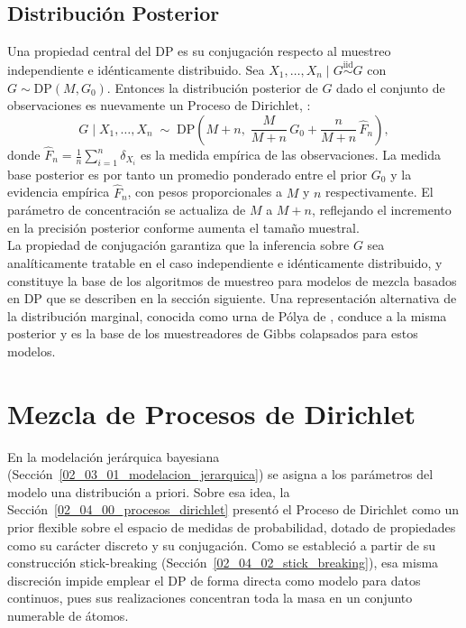 \subsection{Distribución Posterior}
\label{02_04_03_posterior_dp}
Una propiedad central del DP es su conjugación respecto al muestreo independiente e idénticamente distribuido. Sea $X_1, \dots, X_n \mid G \overset{\mathrm{iid}}{\sim} G$ con $G \sim \mathrm{DP}(M, G_0)$. Entonces la distribución posterior de $G$ dado el conjunto de observaciones es nuevamente un Proceso de Dirichlet, \cite{02_04_muller2015bayesian}:
\begin{equation}\label{eq:dp_posterior}
    G \mid X_1, \dots, X_n \;\sim\;
    \mathrm{DP}\!\left(M + n,\;\frac{M}{M+n}\,G_0
    + \frac{n}{M+n}\,\hat{F}_n\right),
\end{equation}
donde $\hat{F}_n = \frac{1}{n}\sum_{i=1}^n \delta_{X_i}$ es la medida empírica de las observaciones. La medida base posterior es por tanto un promedio ponderado entre el prior $G_0$ y la evidencia empírica $\hat{F}_n$, con pesos proporcionales a $M$ y $n$ respectivamente. El parámetro de concentración se actualiza de $M$ a $M + n$, reflejando el incremento en la precisión posterior conforme aumenta el tamaño muestral.\\

La propiedad de conjugación garantiza que la inferencia sobre $G$ sea analíticamente tratable en el caso independiente e idénticamente distribuido, y constituye la base de los algoritmos de muestreo para modelos de mezcla basados en DP que se describen en la sección siguiente. Una representación alternativa de la distribución marginal, conocida como urna de Pólya de  \cite{02_04_blackwell1973polya}, conduce a la misma posterior y es la base de los muestreadores de Gibbs colapsados para estos modelos.

\section{Mezcla de Procesos de Dirichlet}
\label{02_05_00_mezclas_dpm}
En la modelación jerárquica bayesiana (Sección~\ref{02_03_01_modelacion_jerarquica}) se asigna a los parámetros del modelo una distribución a priori. Sobre esa idea, la Sección~\ref{02_04_00_procesos_dirichlet} presentó el Proceso de Dirichlet como un prior flexible sobre el espacio de medidas de probabilidad, dotado de propiedades como su carácter discreto y su conjugación. Como se estableció a partir de su construcción stick-breaking (Sección~\ref{02_04_02_stick_breaking}), esa misma discreción impide emplear el DP de forma directa como modelo para datos continuos, pues sus realizaciones concentran toda la masa en un conjunto numerable de átomos.\\

